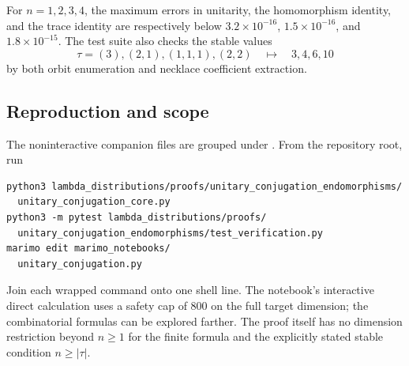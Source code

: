 \documentclass[10pt]{article}
\begin{document}
For $n=1,2,3,4$, the maximum errors in unitarity, the homomorphism identity,
and the trace identity are respectively below
$3.2\times10^{-16}$, $1.5\times10^{-16}$, and $1.8\times10^{-15}$.
The test suite also checks the stable values
\[
  \tau=(3),(2,1),(1,1,1),(2,2)
  \quad\longmapsto\quad 3,4,6,10
\]
by both orbit enumeration and necklace coefficient extraction.

\subsection{Reproduction and scope}

The noninteractive companion files are grouped under
.
From the repository root, run
\begin{verbatim}
python3 lambda_distributions/proofs/unitary_conjugation_endomorphisms/
  unitary_conjugation_core.py
python3 -m pytest lambda_distributions/proofs/
  unitary_conjugation_endomorphisms/test_verification.py
marimo edit marimo_notebooks/
  unitary_conjugation.py
\end{verbatim}
Join each wrapped command onto one shell line.
The notebook's interactive direct calculation uses a
safety cap of $800$ on the full target dimension; the combinatorial formulas
can be explored farther.  The proof itself has no dimension restriction
beyond $n\geq1$ for the finite formula and the explicitly stated stable
condition $n\geq|\tau|$.
\endgroup


\clearpage
\end{document}
